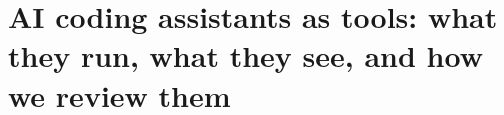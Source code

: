 \chapter{AI coding assistants as tools: what they run, what they see, and how we review them}
\label{ch:ai-coding-assistants-as-tools-what-they}

